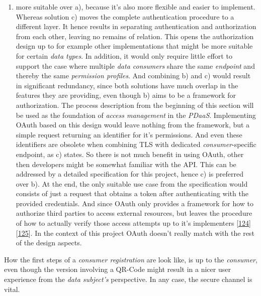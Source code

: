 \documentclass[12pt,english,a4paper,titlepage,cleardoublepage=empty,dottedtoc]{report}
\providecommand{\tightlist}{%
  \setlength{\itemsep}{0pt}\setlength{\parskip}{0pt}}
\begin{document}
\begin{enumerate}
\def\labelenumi{\alph{enumi})}
\setcounter{enumi}{1}
\tightlist
\item
  more suitable over a), because it's also more flexible and easier to
  implement. Whereas solution c) moves the complete authentication
  procedure to a different layer. It hence results in separating
  authentication and authorization from each other, leaving no remains
  of relation. This opens the authorization design up to for example
  other implementations that might be more suitable for certain
  \emph{data types}. In addition, it would only require little effort to
  support the case where multiple \emph{data consumers} share the same
  \emph{endpoint} and thereby the same \emph{permission profiles}. And
  combining b) and c) would result in significant redundancy, since both
  solutions have much overlap in the features they are providing, even
  though b) aims to be a framework for authorization. The process
  description from the beginning of this section will be used as the
  foundation of \emph{access management} in the \emph{PDaaS}.
  Implementing OAuth based on this design would leave nothing from the
  framework, but a simple request returning an identifier for it's
  permissions. And even these identifiers are obsolete when combining
  TLS with dedicated \emph{consumer}-specific endpoint, as c) states. So
  there is not much benefit in using OAuth, other then developers might
  be somewhat familiar with the API. This can be addressed by a detailed
  specification for this project, hence c) is preferred over b). At the
  end, the only suitable use case from the specification would consists
  of just a request that obtains a token after authenticating with the
  provided credentials. And since OAuth only provides a framework for
  how to authorize third parties to access external resources, but
  leaves the procedure of how to actually verify those access attempts
  up to it's implementers
  {[}\protect\hyperlink{ref-web_spec_oauth-1a_access-verification}{124}{]}
  {[}\protect\hyperlink{ref-web_spec_oauth-2_access-verification}{125}{]}.
  In the context of this project OAuth doesn't really match with the
  rest of the design aspects.
\end{enumerate}

How the first steps of a \emph{consumer registration} are look like, is
up to the \emph{consumer}, even though the version involving a QR-Code
might result in a nicer user experience from the \emph{data subject's}
perspective. In any case, the secure channel is vital.
\end{document}
